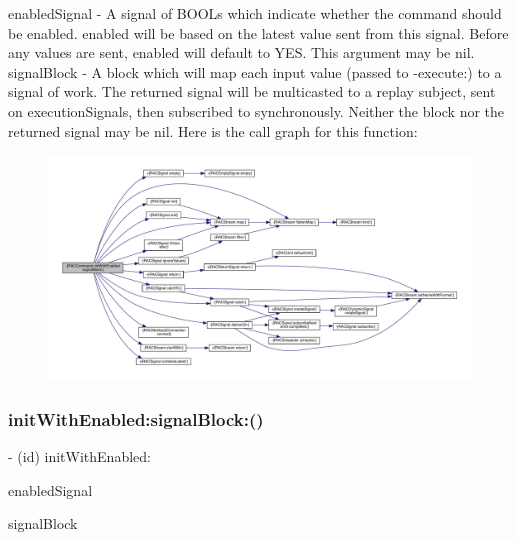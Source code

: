 enabled\+Signal -\/ A signal of B\+O\+O\+Ls which indicate whether the command should be enabled. {\ttfamily enabled} will be based on the latest value sent from this signal. Before any values are sent, {\ttfamily enabled} will default to Y\+ES. This argument may be nil. signal\+Block -\/ A block which will map each input value (passed to -\/execute\+:) to a signal of work. The returned signal will be multicasted to a replay subject, sent on {\ttfamily execution\+Signals}, then subscribed to synchronously. Neither the block nor the returned signal may be nil. Here is the call graph for this function\+:\nopagebreak
\begin{figure}[H]
\begin{center}
\leavevmode
\includegraphics[width=350pt]{interface_r_a_c_command_a753274fc1cc9abfebbd5488a0a09adab_cgraph}
\end{center}
\end{figure}
\mbox{\label{interface_r_a_c_command_a753274fc1cc9abfebbd5488a0a09adab}} 
\subsubsection{\texorpdfstring{init\+With\+Enabled\+:signal\+Block\+:()}{initWithEnabled:signalBlock:()}\hspace{0.1cm}{\footnotesize\ttfamily [2/3]}}
{\footnotesize\ttfamily -\/ (id) init\+With\+Enabled\+: \begin{DoxyParamCaption}\item[{(\mbox{\hyperlink{interface_r_a_c_signal}{R\+A\+C\+Signal}} $\ast$)}]{enabled\+Signal }\item[{signalBlock:(\mbox{\hyperlink{interface_r_a_c_signal}{R\+A\+C\+Signal}} $\ast$($^\wedge$)(id input))}]{signal\+Block }\end{DoxyParamCaption}}

